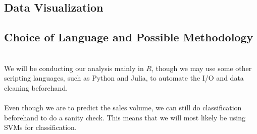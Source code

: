 \documentclass[psamsfonts]{amsart}
\begin{document}
\newpage
\subsection*{Data Visualization}
\subsection*{Choice of Language and Possible Methodology}
\hfill \\

 
We will be conducting our analysis mainly in $R$, though we may use some other scripting languages, such as Python and Julia, to automate the I/O and data cleaning beforehand.\\
\\
Even though we are to predict the sales volume, we can still do classification beforehand to do a sanity check. This means that we will most likely be using SVMs for classification.
\end{document}
